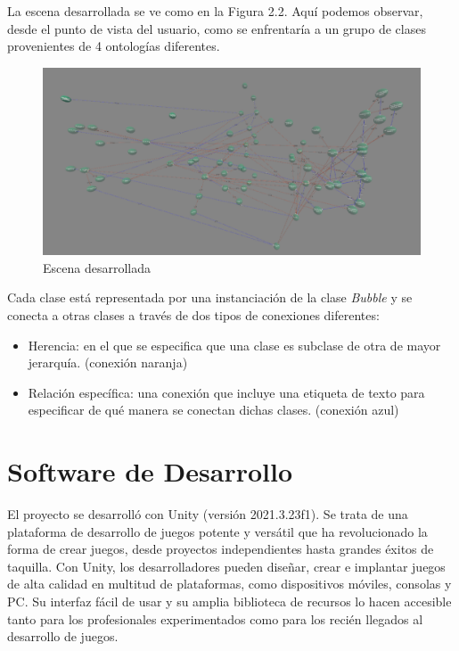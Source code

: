 La escena desarrollada se ve como en la Figura 2.2. Aquí podemos observar, desde el punto de vista del usuario, como se enfrentaría a un grupo de clases provenientes de 4 ontologías diferentes.

\begin{figure}[ht]
   \begin{center}
      \includegraphics[width=0.7\linewidth]{chapter2/figures/ontology_project.png}
   \end{center}
   \caption[Escena desarrollada]
   {\footnotesize Escena desarrollada}
   \label{fig:mufigure9}
\end{figure}

Cada clase está representada por una instanciación de la clase \textit{Bubble} y se conecta a otras clases a través de dos tipos de conexiones diferentes:
\begin{itemize}
   \item Herencia: en el que se especifica que una clase es subclase de otra de mayor jerarquía. (conexión naranja)
   \item Relación específica: una conexión que incluye una etiqueta de texto para especificar de qué manera se conectan dichas clases. (conexión azul) 
\end{itemize}

\section{Software de Desarrollo}

El proyecto se desarrolló con Unity (versión 2021.3.23f1). Se trata de una plataforma de desarrollo de juegos potente y versátil que ha revolucionado la forma de crear juegos, desde proyectos independientes hasta grandes éxitos de taquilla. Con Unity, los desarrolladores pueden diseñar, crear e implantar juegos de alta calidad en multitud de plataformas, como dispositivos móviles, consolas y PC. Su interfaz fácil de usar y su amplia biblioteca de recursos lo hacen accesible tanto para los profesionales experimentados como para los recién llegados al desarrollo de juegos.

